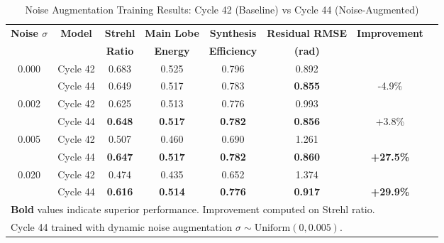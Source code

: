 \begin{table}[htbp]
\centering
\caption{Noise Augmentation Training Results: Cycle 42 (Baseline) vs Cycle 44 (Noise-Augmented)}
\label{tab:noise_augmentation}
\begin{tabular}{cccccccc}
\toprule
\multirow{2}{*}{\textbf{Noise $\sigma$}} & \multirow{2}{*}{\textbf{Model}} & \textbf{Strehl} & \textbf{Main Lobe} & \textbf{Synthesis} & \textbf{Residual RMSE} & \multirow{2}{*}{\textbf{Improvement}} \\
 &  & \textbf{Ratio} & \textbf{Energy} & \textbf{Efficiency} & \textbf{(rad)} & \\
\midrule
0.000 & Cycle 42 & 0.683 & 0.525 & 0.796 & 0.892 & \\
 & Cycle 44 & 0.649 & 0.517 & 0.783 & \textbf{0.855} & -4.9\% \\
\midrule
0.002 & Cycle 42 & 0.625 & 0.513 & 0.776 & 0.993 & \\
 & Cycle 44 & \textbf{0.648} & \textbf{0.517} & \textbf{0.782} & \textbf{0.856} & +3.8\% \\
\midrule
0.005 & Cycle 42 & 0.507 & 0.460 & 0.690 & 1.261 & \\
 & Cycle 44 & \textbf{0.647} & \textbf{0.517} & \textbf{0.782} & \textbf{0.860} & \textbf{+27.5\%} \\
\midrule
0.020 & Cycle 42 & 0.474 & 0.435 & 0.652 & 1.374 & \\
 & Cycle 44 & \textbf{0.616} & \textbf{0.514} & \textbf{0.776} & \textbf{0.917} & \textbf{+29.9\%} \\
\bottomrule
\multicolumn{7}{l}{\textbf{Bold} values indicate superior performance. Improvement computed on Strehl ratio.} \\
\multicolumn{7}{l}{Cycle 44 trained with dynamic noise augmentation $\sigma \sim \text{Uniform}(0, 0.005)$.} \\
\end{tabular}
\end{table}
